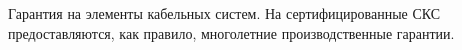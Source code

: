 Гарантия на элементы кабельных систем. На сертифицированные
СКС предоставляются, как правило, многолетние
производственные гарантии.